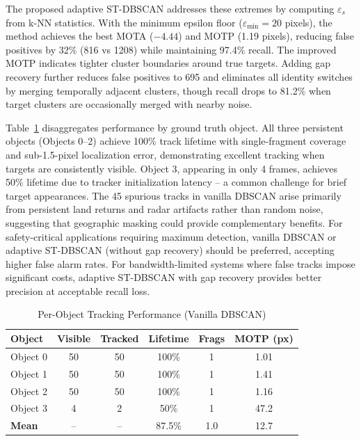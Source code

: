\documentclass[conf]{new-aiaa}
\begin{document}
The proposed adaptive ST-DBSCAN addresses these extremes by computing $\varepsilon_s$ from k-NN statistics. With the minimum epsilon floor ($\varepsilon_{\min} = 20$ pixels), the method achieves the best MOTA ($-4.44$) and MOTP (1.19 pixels), reducing false positives by 32\% (816 vs 1208) while maintaining 97.4\% recall. The improved MOTP indicates tighter cluster boundaries around true targets. Adding gap recovery further reduces false positives to 695 and eliminates all identity switches by merging temporally adjacent clusters, though recall drops to 81.2\% when target clusters are occasionally merged with nearby noise.

Table~\ref{tab:per_object} disaggregates performance by ground truth object. All three persistent objects (Objects 0--2) achieve 100\% track lifetime with single-fragment coverage and sub-1.5-pixel localization error, demonstrating excellent tracking when targets are consistently visible. Object 3, appearing in only 4 frames, achieves 50\% lifetime due to tracker initialization latency -- a common challenge for brief target appearances. The 45 spurious tracks in vanilla DBSCAN arise primarily from persistent land returns and radar artifacts rather than random noise, suggesting that geographic masking could provide complementary benefits. For safety-critical applications requiring maximum detection, vanilla DBSCAN or adaptive ST-DBSCAN (without gap recovery) should be preferred, accepting higher false alarm rates. For bandwidth-limited systems where false tracks impose significant costs, adaptive ST-DBSCAN with gap recovery provides better precision at acceptable recall loss.

\begin{table}[h]
\centering
\caption{Per-Object Tracking Performance (Vanilla DBSCAN)}
\label{tab:per_object}
\begin{tabular*}{\textwidth}{@{\extracolsep{\fill}}lccccc@{}}
\toprule
\textbf{Object} & \textbf{Visible} & \textbf{Tracked} & \textbf{Lifetime} & \textbf{Frags} & \textbf{MOTP (px)} \\
\midrule
Object 0 & 50 & 50 & 100\% & 1 & 1.01 \\
Object 1 & 50 & 50 & 100\% & 1 & 1.41 \\
Object 2 & 50 & 50 & 100\% & 1 & 1.16 \\
Object 3 & 4 & 2 & 50\% & 1 & 47.2 \\
\midrule
\textbf{Mean} &  --  &  --  & 87.5\% & 1.0 & 12.7 \\
\bottomrule
\end{tabular*}
\end{table}
\end{document}
